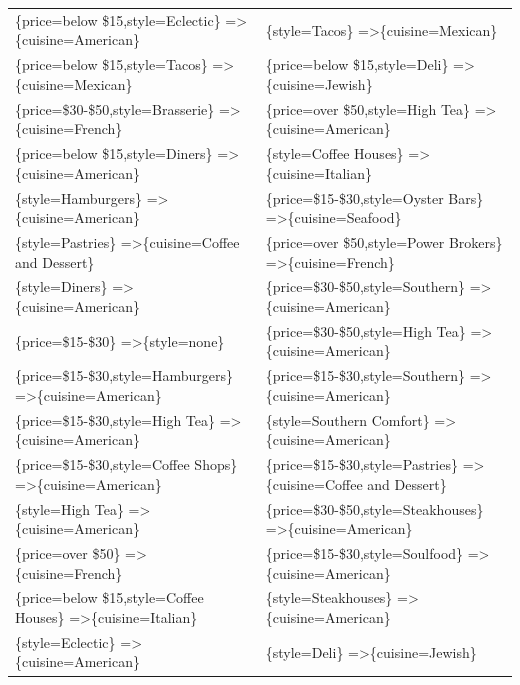 \documentclass[letterpaper,10pt]{article}
\begin{document}
\begin{appendices}
\begin{table}[h]
\begin{adjustbox}{max width=\textwidth}
\begin{tabular}{ll}
\{price=below \$15,style=Eclectic\} =\textgreater \{cuisine=American\} & \{style=Tacos\} =\textgreater \{cuisine=Mexican\} \\ 
\{price=below \$15,style=Tacos\} =\textgreater \{cuisine=Mexican\} & \{price=below \$15,style=Deli\} =\textgreater \{cuisine=Jewish\} \\ 
\{price=\$30-\$50,style=Brasserie\} =\textgreater \{cuisine=French\} & \{price=over \$50,style=High Tea\} =\textgreater \{cuisine=American\} \\ 
\{price=below \$15,style=Diners\} =\textgreater \{cuisine=American\} & \{style=Coffee Houses\} =\textgreater \{cuisine=Italian\} \\ 
\{style=Hamburgers\} =\textgreater \{cuisine=American\} & \{price=\$15-\$30,style=Oyster Bars\} =\textgreater \{cuisine=Seafood\} \\ 
\{style=Pastries\} =\textgreater \{cuisine=Coffee and Dessert\} & \{price=over \$50,style=Power Brokers\} =\textgreater \{cuisine=French\} \\ 
\{style=Diners\} =\textgreater \{cuisine=American\} & \{price=\$30-\$50,style=Southern\} =\textgreater \{cuisine=American\} \\ 
\{price=\$15-\$30\} =\textgreater \{style=none\} & \{price=\$30-\$50,style=High Tea\} =\textgreater \{cuisine=American\} \\ 
\{price=\$15-\$30,style=Hamburgers\} =\textgreater \{cuisine=American\} & \{price=\$15-\$30,style=Southern\} =\textgreater \{cuisine=American\} \\ 
\{price=\$15-\$30,style=High Tea\} =\textgreater \{cuisine=American\} & \{style=Southern Comfort\} =\textgreater \{cuisine=American\} \\ 
\{price=\$15-\$30,style=Coffee Shops\} =\textgreater \{cuisine=American\} & \{price=\$15-\$30,style=Pastries\} =\textgreater \{cuisine=Coffee and Dessert\} \\ 
\{style=High Tea\} =\textgreater \{cuisine=American\} & \{price=\$30-\$50,style=Steakhouses\} =\textgreater \{cuisine=American\} \\ 
\{price=over \$50\} =\textgreater \{cuisine=French\} & \{price=\$15-\$30,style=Soulfood\} =\textgreater \{cuisine=American\} \\ 
\{price=below \$15,style=Coffee Houses\} =\textgreater \{cuisine=Italian\} & \{style=Steakhouses\} =\textgreater \{cuisine=American\} \\ 
\{style=Eclectic\} =\textgreater \{cuisine=American\} & \{style=Deli\} =\textgreater \{cuisine=Jewish\} \\ 

\end{tabular}
\end{adjustbox}
\end{table}
\end{appendices}
\end{document}
